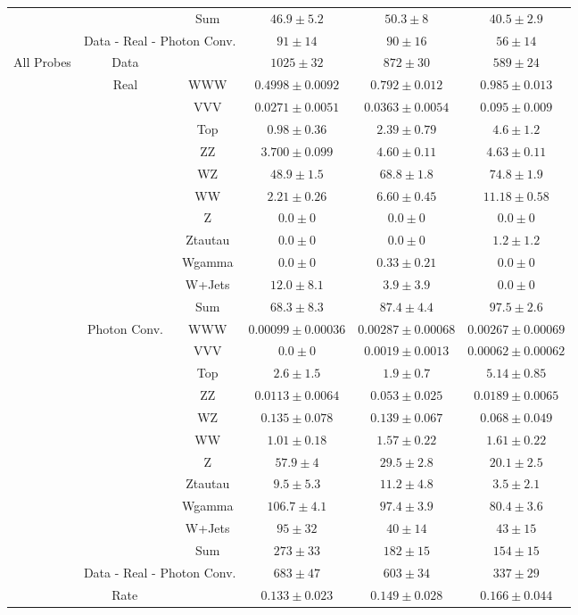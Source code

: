 \begin{tabular}{|c|cc||c|c|c|}
\cline{3-6}
&& Sum &  $46.9 \pm 5.2$ &  $50.3 \pm 8$ &  $40.5 \pm 2.9$\\ 
\cline{2-6}
\cline{2-6}
&\multicolumn{2}{|c||}{Data - Real - Photon Conv.} &  $ 91 \pm 14$ &  $ 90 \pm 16$ &  $ 56 \pm 14$\\ 
\hline
\hline
\multirow{23}{*}{All Probes} & Data & &  $1025 \pm 32$ &  $872 \pm 30$ &  $589 \pm 24$\\ 
\cline{2-6}
&\multirow{11}{*}{Real}& WWW &  $0.4998 \pm 0.0092$ &  $0.792 \pm 0.012$ &  $0.985 \pm 0.013$\\ 
&& VVV &  $0.0271 \pm 0.0051$ &  $0.0363 \pm 0.0054$ &  $0.095 \pm 0.009$\\ 
&& Top &  $0.98 \pm 0.36$ &  $2.39 \pm 0.79$ &  $4.6 \pm 1.2$\\ 
&& ZZ &  $3.700 \pm 0.099$ &  $4.60 \pm 0.11$ &  $4.63 \pm 0.11$\\ 
&& WZ &  $48.9 \pm 1.5$ &  $68.8 \pm 1.8$ &  $74.8 \pm 1.9$\\ 
&& WW &  $2.21 \pm 0.26$ &  $6.60 \pm 0.45$ &  $11.18 \pm 0.58$\\ 
&& Z &  $0.0 \pm 0$ &  $0.0 \pm 0$ &  $0.0 \pm 0$\\ 
&& Ztautau &  $0.0 \pm 0$ &  $0.0 \pm 0$ &  $1.2 \pm 1.2$\\ 
&& Wgamma &  $0.0 \pm 0$ &  $0.33 \pm 0.21$ &  $0.0 \pm 0$\\ 
&& W+Jets &  $12.0 \pm 8.1$ &  $3.9 \pm 3.9$ &  $0.0 \pm 0$\\ 
\cline{3-6}
&& Sum &  $68.3 \pm 8.3$ &  $87.4 \pm 4.4$ &  $97.5 \pm 2.6$\\ 
\cline{2-6}
\cline{2-6}
&\multirow{11}{*}{Photon Conv.}& WWW &  $0.00099 \pm 0.00036$ &  $0.00287 \pm 0.00068$ &  $0.00267 \pm 0.00069$\\ 
&& VVV &  $0.0 \pm 0$ &  $0.0019 \pm 0.0013$ &  $0.00062 \pm 0.00062$\\ 
&& Top &  $2.6 \pm 1.5$ &  $1.9 \pm 0.7$ &  $5.14 \pm 0.85$\\ 
&& ZZ &  $0.0113 \pm 0.0064$ &  $0.053 \pm 0.025$ &  $0.0189 \pm 0.0065$\\ 
&& WZ &  $0.135 \pm 0.078$ &  $0.139 \pm 0.067$ &  $0.068 \pm 0.049$\\ 
&& WW &  $1.01 \pm 0.18$ &  $1.57 \pm 0.22$ &  $1.61 \pm 0.22$\\ 
&& Z &  $57.9 \pm 4$ &  $29.5 \pm 2.8$ &  $20.1 \pm 2.5$\\ 
&& Ztautau &  $9.5 \pm 5.3$ &  $11.2 \pm 4.8$ &  $3.5 \pm 2.1$\\ 
&& Wgamma &  $106.7 \pm 4.1$ &  $97.4 \pm 3.9$ &  $80.4 \pm 3.6$\\ 
&& W+Jets &  $ 95 \pm 32$ &  $ 40 \pm 14$ &  $ 43 \pm 15$\\ 
\cline{3-6}
&& Sum &  $273 \pm 33$ &  $182 \pm 15$ &  $154 \pm 15$\\ 
\cline{2-6}
\cline{2-6}
&\multicolumn{2}{|c||}{Data - Real - Photon Conv.} &  $683 \pm 47$ &  $603 \pm 34$ &  $337 \pm 29$\\ 
\hline
\hline
\multicolumn{3}{|c||}{Rate} &  $0.133 \pm 0.023$ &  $0.149 \pm 0.028$ &  $0.166 \pm 0.044$\\ 
\hline
\end{tabular}
